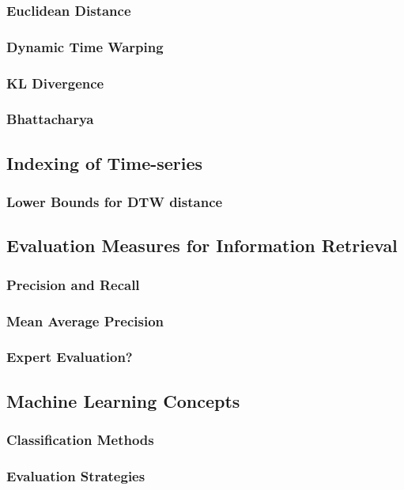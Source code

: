 {\subsubsection{Euclidean Distance}
\subsubsection{Dynamic Time Warping}
\subsubsection{KL Divergence}
\subsubsection{Bhattacharya}

\subsection{Indexing of Time-series}
\subsubsection{Lower Bounds for DTW distance}

\subsection{Evaluation Measures for Information Retrieval}
\subsubsection{Precision and Recall}
\subsubsection{Mean Average Precision}
\subsubsection{Expert Evaluation?}

\subsection{Machine Learning Concepts}
\subsubsection{Classification Methods}
\subsubsection{Evaluation Strategies}

}
